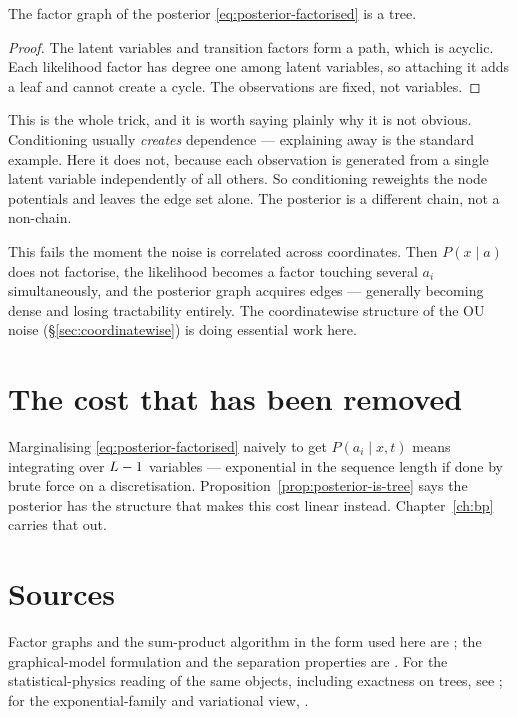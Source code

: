 \begin{proposition}
\label{prop:posterior-is-tree}
The factor graph of the posterior \eqref{eq:posterior-factorised} is a tree.
\end{proposition}

\begin{proof}
The latent variables and transition factors form a path, which is acyclic. Each likelihood
factor has degree one among latent variables, so attaching it adds a leaf and cannot create a
cycle. The observations are fixed, not variables.
\end{proof}

\begin{intuition}
This is the whole trick, and it is worth saying plainly why it is not obvious. Conditioning
usually \emph{creates} dependence --- explaining away is the standard example. Here it does
not, because each observation is generated from a single latent variable independently of all
others. So conditioning reweights the node potentials and leaves the edge set alone. The
posterior is a different chain, not a non-chain.
\end{intuition}

\begin{pitfall}
This fails the moment the noise is correlated across coordinates. Then
$P(x\mid a)$ does not factorise, the likelihood becomes a factor touching several $a_i$
simultaneously, and the posterior graph acquires edges --- generally becoming dense and
losing tractability entirely. The coordinatewise structure of the OU noise
(\S\ref{sec:coordinatewise}) is doing essential work here.
\end{pitfall}

\section{The cost that has been removed}

Marginalising \eqref{eq:posterior-factorised} naively to get $P(a_i\mid x,t)$ means
integrating over $L-1$ variables --- exponential in the sequence length if done by brute
force on a discretisation. Proposition~\ref{prop:posterior-is-tree} says the posterior has the
structure that makes this cost linear instead. Chapter~\ref{ch:bp} carries that out.

\section*{Sources}
Factor graphs and the sum-product algorithm in the form used here are \citet{kschischang2001factor};
the graphical-model formulation and the separation properties are \citet{pearl1988}. For the
statistical-physics reading of the same objects, including exactness on trees, see
\citet{mezard2009information}; for the exponential-family and variational view, \citet{wainwright2008}.
